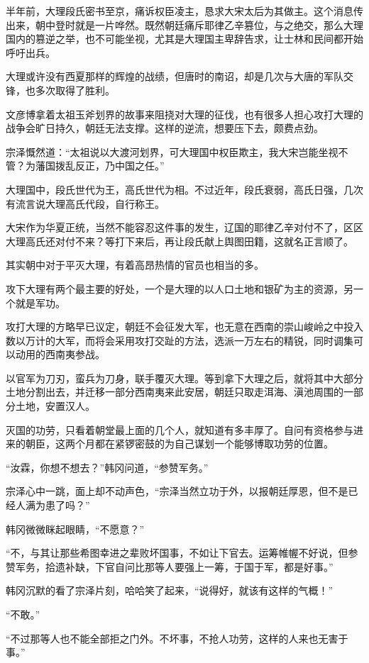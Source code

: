 半年前，大理段氏密书至京，痛诉权臣凌主，恳求大宋太后为其做主。这个消息传出来，朝中登时就是一片哗然。既然朝廷痛斥耶律乙辛篡位，与之绝交，那么大理国内的篡逆之举，也不可能坐视，尤其是大理国主卑辞告求，让士林和民间都开始呼吁出兵。

大理或许没有西夏那样的辉煌的战绩，但唐时的南诏，却是几次与大唐的军队交锋，也多次取得了胜利。

文彦博拿着太祖玉斧划界的故事来阻挠对大理的征伐，也有很多人担心攻打大理的战争会旷日持久，朝廷无法支撑。这样的逆流，想要压下去，颇费点劲。

宗泽慨然道：“太祖说以大渡河划界，可大理国中权臣欺主，我大宋岂能坐视不管？为藩国拨乱反正，乃中国之任。”

大理国中，段氏世代为王，高氏世代为相。不过近年，段氏衰弱，高氏日强，几次有流言说大理高氏代段，自行称王。

大宋作为华夏正统，当然不能容忍这件事的发生，辽国的耶律乙辛对付不了，区区大理高氏还对付不来？等打下来后，再让段氏献上舆图田籍，这就名正言顺了。

其实朝中对于平灭大理，有着高昂热情的官员也相当的多。

攻下大理有两个最主要的好处，一个是大理的以人口土地和银矿为主的资源，另一个就是军功。

攻打大理的方略早已议定，朝廷不会征发大军，也无意在西南的崇山峻岭之中投入数以万计的大军，而将会采用攻打交趾的方法，选派一万左右的精锐，同时调集可以动用的西南夷参战。

以官军为刀刃，蛮兵为刀身，联手覆灭大理。等到拿下大理之后，就将其中大部分土地分割出去，并迁移一部分西南夷来此安居，朝廷只取走洱海、滇池周围的一部分土地，安置汉人。

灭国的功劳，只看着朝堂最上面的几个人，就知道有多丰厚了。自问有资格参与进来的朝臣，这两个月都在紧锣密鼓的为自己谋划一个能够博取功劳的位置。

“汝霖，你想不想去？”韩冈问道，“参赞军务。”

宗泽心中一跳，面上却不动声色，“宗泽当然立功于外，以报朝廷厚恩，但不是已经人满为患了吗？”

韩冈微微眯起眼睛，“不愿意？”

“不，与其让那些希图幸进之辈败坏国事，不如让下官去。运筹帷幄不好说，但参赞军务，拾遗补缺，下官自问比那等人要强上一筹，于国于军，都是好事。”

韩冈沉默的看了宗泽片刻，哈哈笑了起来，“说得好，就该有这样的气概！”

“不敢。”

“不过那等人也不能全部拒之门外。不坏事，不抢人功劳，这样的人来也无害于事。”

